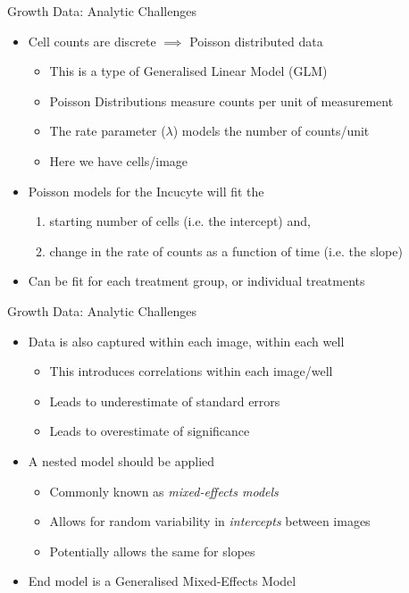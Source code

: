 \documentclass[11pt]{beamer}
\begin{document}
\begin{frame}{Growth Data: Analytic Challenges}

	\begin{itemize}
		\item Cell counts are discrete $\implies$ Poisson distributed data
		\begin{itemize}
			\item This is a type of Generalised Linear Model (GLM)
			\item Poisson Distributions measure counts per unit of measurement
			\item The rate parameter ($\lambda$) models the number of counts/unit
			\item Here we have cells/image
		\end{itemize}
		\item Poisson models for the Incucyte will fit the
		\begin{enumerate}
			\item starting number of cells (i.e. the intercept) and,
			\item change in the rate of counts as a function of time (i.e. the slope)
		\end{enumerate}			
		\item Can be fit for each treatment group, or individual treatments
	\end{itemize}

\end{frame}

\begin{frame}{Growth Data: Analytic Challenges}

	\begin{itemize}
		\item Data is also captured within each image, within each well
		\begin{itemize}
			\item This introduces correlations within each image/well
			\item Leads to underestimate of standard errors
			\item Leads to overestimate of significance
		\end{itemize}
		\item A nested model should be applied
		\begin{itemize}
			\item Commonly known as \textit{mixed-effects models}
			\item Allows for random variability in \textit{intercepts} between images
			\item Potentially allows the same for slopes
		\end{itemize}
		\item End model is a Generalised Mixed-Effects Model
	\end{itemize}

\end{frame}
\end{document}
